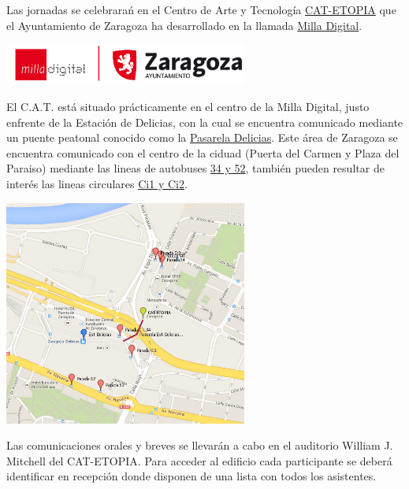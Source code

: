 Las jornadas se celebrarań en el Centro de Arte y Tecnología 
\href{http://www.zaragoza.es/ciudad/idezar/detalle_Centro?id=5105}{CAT-ETOPIA}
que  el Ayuntamiento de Zaragoza ha desarrollado en la llamada 
\href{http://www.milladigital.es/espanol/home.php}{Milla Digital}. 

\begin{center}
\includegraphics[width=0.6\textwidth]{Logos/logoMillaAyZgz.png}
\end{center}

El C.A.T. está situado prácticamente en el centro de la Milla Digital, 
justo enfrente de la Estación de Delicias, con la cual se encuentra 
comunicado mediante un puente peatonal conocido como la 
\href{http://www.puentemania.com/692}{Pasarela Delicias}.  Este área de 
Zaragoza se encuentra comunicado con el centro de la ciduad (Puerta del 
Carmen y Plaza del Paraiso) mediante las lineas de autobuses
\href{http://www.urbanosdezaragoza.es/frm_verdescarga.php?ref=175}{34 y 52},
también pueden resultar de interés las lineas circulares
\href{http://www.urbanosdezaragoza.es/frm_verdescarga.php?ref=175}{Ci1 y Ci2}.

\begin{center} 
\includegraphics[width=0.6\textwidth]{Logos/mapaParadas.png}
\end{center}



Las comunicaciones orales y breves se llevarán a cabo en el auditorio 
William J. Mitchell del CAT-ETOPIA. Para acceder al edificio cada 
participante se deberá identificar en recepción donde disponen de una 
lista con todos los asistentes.


